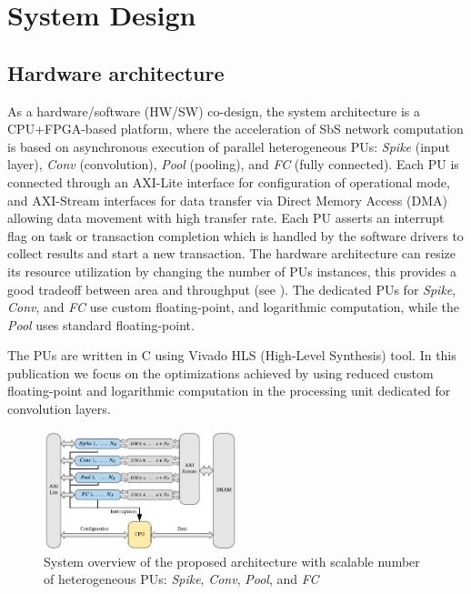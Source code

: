 \section{System Design}
\label{sec:system_design}
\subsection{Hardware architecture} \label{Hardware_architecture}

As a hardware/software (HW/SW) co-design, the system architecture is a CPU+FPGA-based platform, where the acceleration of SbS network computation is based on asynchronous execution of parallel heterogeneous PUs: \emph{Spike} (input layer), \emph{Conv} (convolution), \emph{Pool} (pooling), and \emph{FC} (fully connected). Each PU is connected through an AXI-Lite interface for configuration of operational mode, and AXI-Stream interfaces for data transfer via Direct Memory Access (DMA) allowing data movement with high transfer rate. Each PU asserts an interrupt flag on task or transaction completion which is handled by the software drivers to collect results and start a new transaction. The hardware architecture can resize its resource utilization by changing the number of PUs instances, this provides a good tradeoff between area and throughput (see ). The dedicated PUs for \emph{Spike}, \emph{Conv}, and \emph{FC} use custom floating-point, and logarithmic computation, while the \emph{Pool} uses standard floating-point.

The PUs are written in C using Vivado HLS (High-Level Synthesis) tool. In this publication we focus on the optimizations achieved by using reduced custom floating-point and logarithmic computation in the processing unit dedicated for convolution layers.

\begin{figure}
	\centering
	\includegraphics[width=0.5\textwidth]{../figures/sbs_hw.pdf}
	\caption{System overview of the proposed architecture with scalable number of heterogeneous PUs: \emph{Spike}, \emph{Conv}, \emph{Pool}, and \emph{FC}}
	\label{fig:hw_sbs}
\end{figure}


